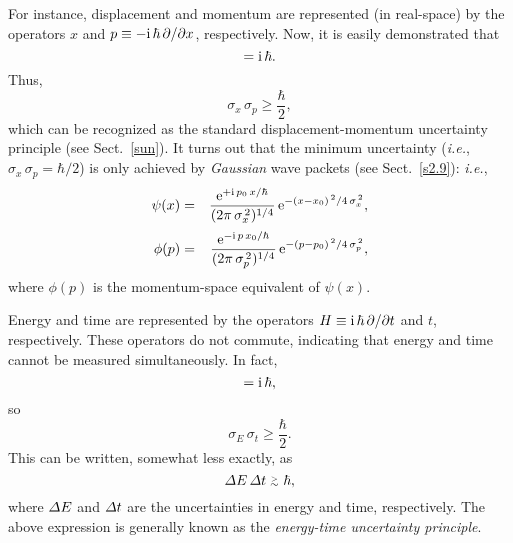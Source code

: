 For instance, displacement and momentum are represented (in real-space) by the
operators $x$ and $p\equiv-{\rm i}\,\hbar\,\partial/\partial x$, respectively.
Now, it is easily demonstrated that
\begin{equation}
[x,p] = {\rm i}\,\hbar.
\end{equation}
Thus,
\begin{equation}
\sigma_x\,\sigma_p\geq \frac{\hbar}{2},
\end{equation}
which can be recognized as the standard displacement-momentum uncertainty
principle (see Sect.~\ref{sun}). It turns out that the minimum uncertainty ({\em i.e.},
$\sigma_x\,\sigma_p=\hbar/2$) is only achieved by {\em Gaussian}\/ wave packets (see Sect.~\ref{s2.9}): {\em i.e.},
\begin{eqnarray}
\psi(x) &=& \frac{{\rm e}^{+{\rm i}\,p_0\,x/\hbar}}{(2\pi\,\sigma_x^{\,2})^{1/4}}\,{\rm e}^{-(x-x_0)^{\,2}/4\,\sigma_x^{\,2}},\\[0.5ex]
\phi(p) &=&\frac{{\rm e}^{-{\rm i}\,p\,x_0/\hbar}}{(2\pi\,\sigma_p^{\,2})^{1/4}}\,{\rm e}^{-(p-p_0)^{\,2}/4\,\sigma_p^{\,2}},
\end{eqnarray}
where $\phi(p)$ is the momentum-space equivalent of $\psi(x)$.

Energy and time are represented by the operators $H\equiv{\rm i}\,\hbar\,\partial/\partial t$ and $t$, respectively. These operators do not commute,
indicating that energy and time cannot be measured simultaneously.
In fact,
\begin{equation}
[H,t] = {\rm i}\,\hbar,
\end{equation}
so
\begin{equation}
\sigma_E\,\sigma_t\geq \frac{\hbar}{2}.
\end{equation}
This can be written, somewhat less exactly, as
\begin{equation}
{\mit\Delta}E\,{\mit\Delta} t\gtapp \hbar,
\end{equation}
where ${\mit\Delta}E$ and ${\mit\Delta} t$ are the uncertainties in
energy and time, respectively. The above expression is generally
known as the {\em energy-time uncertainty principle}.

